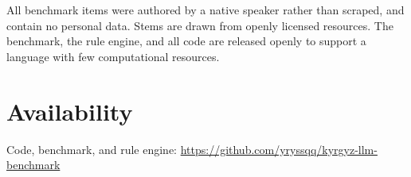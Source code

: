 \documentclass[11pt]{article}
\begin{document}
All benchmark items were authored by a native speaker rather than scraped, and contain
no personal data. Stems are drawn from openly licensed resources. The benchmark, the
rule engine, and all code are released openly to support a language with few
computational resources.

\section*{Availability}

Code, benchmark, and rule engine:
\url{https://github.com/yryssqq/kyrgyz-llm-benchmark}



\end{document}
